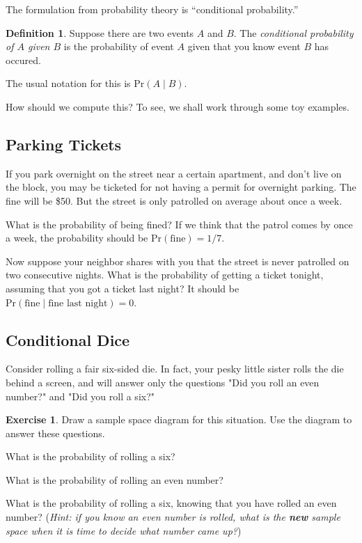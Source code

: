 \documentclass[12pt,letterpaper]{article}
\theoremstyle{definition}
\newtheorem{exercise}[question]{Exercise}
\newtheorem*{definition}{Definition}
\begin{document}
The formulation from probability theory is ``conditional probability.''
\begin{definition}
Suppose there are two events $A$ and $B$.
The \emph{conditional probability of $A$ given $B$} is the probability of event $A$ given that you know event $B$ has occured.

The usual notation for this is $\mathrm{Pr}(A\mid B)$.
\end{definition}

How should we compute this? To see, we shall work through some toy examples.

\subsection*{Parking Tickets} If you park overnight on the street near a certain apartment, and don't live on the block, you may be ticketed for not having a permit for overnight parking. The fine will be \$50. But the street is only patrolled on average about once a week.

What is the probability of being fined? If we think that the patrol comes by once a week, the probability should be $\mathrm{Pr}(\text{fine}) = 1/7$.


Now suppose your neighbor shares with you that the street is never patrolled on two consecutive nights. What is the probability of getting a ticket tonight, assuming that you got a ticket last night? It should be $\mathrm{Pr}(\text{fine} \mid \text{fine last night})=0.$



\subsection*{Conditional Dice}
Consider rolling a fair six-sided die. In fact, your pesky little sister rolls the die behind a screen, and will answer only the questions "Did you roll an even number?" and "Did you roll a six?"
\begin{exercise}
Draw a sample space diagram for this situation. Use the diagram to answer these questions.
\begin{compactitem}
\item What is the probability of rolling a six?
\item What is the probability of rolling an even number?
\item What is the probability of rolling a six, knowing that you have rolled an even number?
(\emph{Hint: if you know an even number is rolled, what is the \textbf{new} sample space when it is time to decide what number came up?})
\end{compactitem}
\end{exercise}
\end{document}
